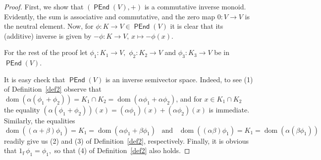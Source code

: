 \documentclass[10pt,a4paper]{amsart}
\theoremstyle{definition}
\theoremstyle{remark}
\numberwithin{equation}{section}
\newtheorem*{Theorem A}{\textbf{Theorem A}}
\newtheorem*{Corollary E}{\textbf{Corollary E}}
\newtheorem*{Corollary F}{\textbf{Corollary F}}
\newtheorem*{Theorem B}{\textbf{Theorem B}}
\newtheorem*{Theorem C}{\textbf{Theorem C}}
\newtheorem*{Theorem D}{\textbf{Theorem B}}
\newtheorem*{p a}{\textbf{Proof of  Theorem A}}
\newtheorem*{p b}{\textbf{Proof of Theorem B}}
\newtheorem*{p c}{\textbf{Proof of  Theorem C}}
\newtheorem*{p d}{\textbf{Proof of  Theorem D}}
\newcommand{\0}{{\vartheta}}
\DeclareMathOperator{\dom}{dom}
\DeclareMathOperator{\pen}{\textsf{PEnd}}
\begin{document}
\begin{proof}
First, we show that $(\pen(V),+)$ is a commutative inverse monoid. Evidently, the sum is associative and commutative, and the  zero map $0: V\to V$ is the neutral element. Now, for $\phi:K\to V\in \pen(V)$  it is clear that its (additive) inverse is given by $-\phi:K\to V, \, x\mapsto -\phi(x)$. 

 For the rest of the proof let  $\phi_1: K_1\to V,$ $\phi_2: K_2\to V$ and $\phi_3: K_3 \to V$  be in  $\pen(V).$

  It is easy check that $\pen(V)$ is an inverse semivector space. Indeed,  to see (1) of Definition~\ref{def2}  observe that $\dom (\alpha  (\phi_1+\phi_2))=K_1\cap K_2=\dom (\alpha  \phi_1+ \alpha  \phi_2)$, and for $x\in K_1\cap K_2$ the equality  $(\alpha  (\phi_1+\phi_2))(x)=(\alpha  \phi_1)(x)+(\alpha \phi_2)(x)$ is immediate. Similarly, the equalities 
$$\dom ((\alpha +\beta)  \phi_1)=K_1=\dom (\alpha  \phi_1+ \beta  \phi_1) \;\;\; \text{and} \;\;\; 
\dom ((\alpha \beta)  \phi_1)=K_1=\dom (\alpha (  \beta  \phi_1))$$ readily give us (2) and (3) of Definition~\ref{def2}, respectively. Finally, it is obvious that $1_{\mathbb F}\phi_1=\phi_1,$ so that  (4) of Definition~\ref{def2} also holds.

		

\end{proof}
\end{document}
